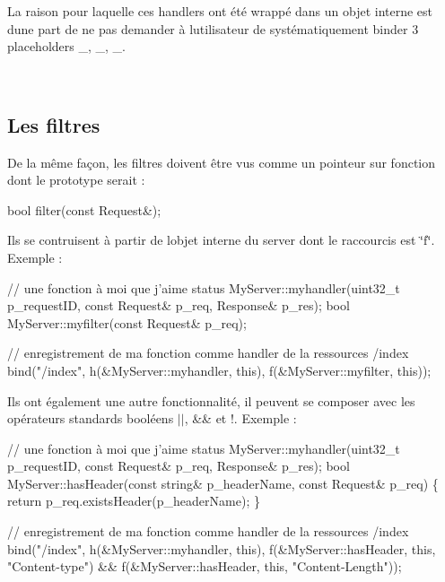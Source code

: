 La raison pour laquelle ces handlers ont été wrappé dans un objet interne est d\textquotesingle{}une part de ne pas demander à l\textquotesingle{}utilisateur de systématiquement binder 3 placeholders \+\_, \+\_, \+\_.

~\newline
 \subsection*{Les filtres }

De la même façon, les filtres doivent être vus comme un pointeur sur fonction dont le prototype serait \+: 
\begin{DoxyCode}
\textcolor{keywordtype}{bool} filter(\textcolor{keyword}{const} Request&);
\end{DoxyCode}


Ils se contruisent à partir de l\textquotesingle{}objet interne du server dont le raccourcis est \char`\"{}f\char`\"{}. Exemple \+: 
\begin{DoxyCode}
\textcolor{comment}{// une fonction à moi que j'aime}
status MyServer::myhandler(uint32\_t p\_requestID, \textcolor{keyword}{const} Request& p\_req, Response& p\_res);
\textcolor{keywordtype}{bool}  MyServer::myfilter(\textcolor{keyword}{const} Request& p\_req);

\textcolor{comment}{// enregistrement de ma fonction comme handler de la ressources /index}
bind(\textcolor{stringliteral}{"/index"}, h(&MyServer::myhandler, \textcolor{keyword}{this}), f(&MyServer::myfilter, \textcolor{keyword}{this}));
\end{DoxyCode}


Ils ont également une autre fonctionnalité, il peuvent se composer avec les opérateurs standards booléens $\vert$$\vert$, \&\& et !. Exemple \+:


\begin{DoxyCode}
\textcolor{comment}{// une fonction à moi que j'aime}
status MyServer::myhandler(uint32\_t p\_requestID, \textcolor{keyword}{const} Request& p\_req, Response& p\_res);
\textcolor{keywordtype}{bool}  MyServer::hasHeader(\textcolor{keyword}{const} \textcolor{keywordtype}{string}& p\_headerName, \textcolor{keyword}{const} Request& p\_req)
\{
  \textcolor{keywordflow}{return} p\_req.existsHeader(p\_headerName);
\}

\textcolor{comment}{// enregistrement de ma fonction comme handler de la ressources /index}
bind(\textcolor{stringliteral}{"/index"},
     h(&MyServer::myhandler, \textcolor{keyword}{this}),
     f(&MyServer::hasHeader, \textcolor{keyword}{this}, \textcolor{stringliteral}{"Content-type"}) &&
     f(&MyServer::hasHeader, \textcolor{keyword}{this}, \textcolor{stringliteral}{"Content-Length"}));
\end{DoxyCode}


